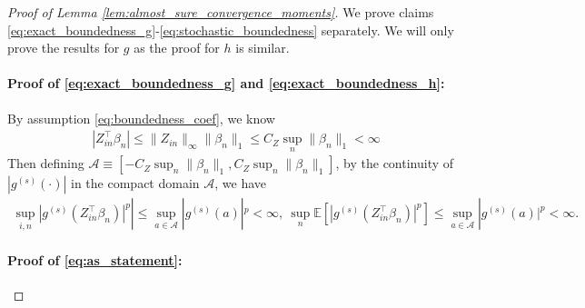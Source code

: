 \documentclass[12pt]{article}
\theoremstyle{definition}
\newcommand{\E}{\mathbb E}								%
\newcommand{\srz}{Z}									%
\begin{document}
\begin{proof}[Proof of Lemma \ref{lem:almost_sure_convergence_moments}]

  We prove claims \eqref{eq:exact_boundedness_g}-\eqref{eq:stochastic_boundedness} separately. We will only prove the results for $g$ as the proof for $h$ is similar.

  \paragraph{Proof of \eqref{eq:exact_boundedness_g} and \eqref{eq:exact_boundedness_h}:}  

  By assumption \eqref{eq:boundedness_coef}, we know 
  \begin{align*}
    |\srz_{in}^\top \beta_n|\leq \|\srz_{in}\|_\infty\|\beta_n\|_1\leq C_Z\sup_n\|\beta_n\|_1<\infty
  \end{align*}
  Then defining $\mathcal{A}\equiv [-C_Z\sup_n\|\beta_n\|_1,C_Z\sup_n\|\beta_n\|_1]$, by the continuity of $|g^{(s)}(\cdot)|$ in the compact domain $\mathcal{A}$, we have 
  \begin{align*}
    \sup_{i,n}|g^{(s)}(\srz_{in}^\top\beta_n)|^p|\leq \sup_{a\in \mathcal{A}}|g^{(s)}(a)|^p<\infty,\ \sup_n\E[|g^{(s)}(\srz_{in}^\top\beta_n)|^p]\leq \sup_{a\in \mathcal{A}}|g^{(s)}(a)|^p<\infty.
  \end{align*}


  \paragraph{Proof of \eqref{eq:as_statement}:} 


\end{proof}
\end{document}

